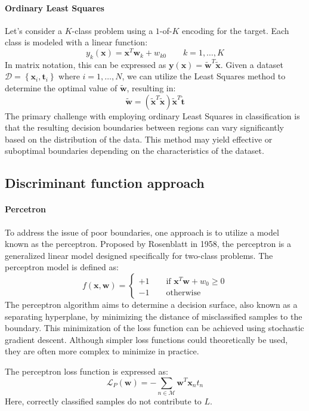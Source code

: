 \paragraph*{Ordinary Least Squares}
Let's consider a $K$-class problem using a $1$-of-$K$ encoding for the target. 
Each class is modeled with a linear function:
\[y_k(\textbf{x})=\textbf{x}^T\textbf{w}_k+w_{k0} \qquad k=1,\dots,K\]
In matrix notation, this can be expressed as $\textbf{y}(\textbf{x})=\tilde{\textbf{w}}^T\tilde{\textbf{x}}$. 
Given a dataset $\mathcal{D}=\left\{ \textbf{x}_i, \textbf{t}_i  \right\}$ where $i=1,\dots,N$, we can utilize the Least Squares method to determine the optimal value of $\tilde{\textbf{w}}$, resulting in:
\[\tilde{\textbf{w}}=\left(\tilde{\textbf{x}}^T\tilde{\textbf{x}}\right)\tilde{\textbf{x}}^T\tilde{\textbf{t}}\]
The primary challenge with employing ordinary Least Squares in classification is that the resulting decision boundaries between regions can vary significantly based on the distribution of the data. 
This method may yield effective or suboptimal boundaries depending on the characteristics of the dataset.

\subsection{Discriminant function approach}
\paragraph*{Percetron}
To address the issue of poor boundaries, one approach is to utilize a model known as the perceptron. 
Proposed by Rosenblatt in 1958, the perceptron is a generalized linear model designed specifically for two-class problems. 
The perceptron model is defined as:
\[f(\textbf{x},\textbf{w})=\begin{cases}
    +1 \qquad \text{if } \textbf{x}^T\textbf{w}+w_0 \geq 0 \\
    -1 \qquad \text{otherwise}
\end{cases}\]
The perceptron algorithm aims to determine a decision surface, also known as a separating hyperplane, by minimizing the distance of misclassified samples to the boundary. 
This minimization of the loss function can be achieved using stochastic gradient descent.
Although simpler loss functions could theoretically be used, they are often more complex to minimize in practice. 

The perceptron loss function is expressed as:
\[\mathcal{L}_P(\textbf{w})=-\sum_{n \in \mathcal{M}}\textbf{w}^T\textbf{x}_nt_n\]
Here, correctly classified samples do not contribute to $L$. 

